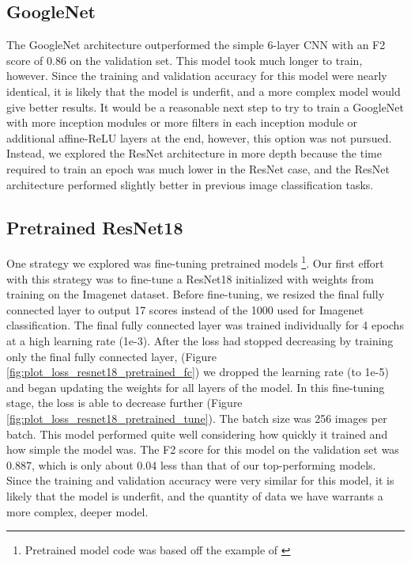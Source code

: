 \documentclass[10pt,twocolumn,letterpaper]{article}
\begin{document}
\subsection*{GoogleNet}

The GoogleNet architecture outperformed the simple 6-layer CNN with an F2 score of 0.86 on the validation set. This model took much longer to train, however. Since the training and validation accuracy for this model were nearly identical, it is likely that the model is underfit, and a more complex model would give better results. It would be a reasonable next step to try to train a GoogleNet with more inception modules or more filters in each inception module or additional affine-ReLU layers at the end, however, this option was not pursued. Instead, we explored the ResNet architecture in more depth because the time required to train an epoch was much lower in the ResNet case, and the ResNet architecture performed slightly better in previous image classification tasks. \cite{TransferLearning1} \cite{imagenet}

\subsection*{Pretrained ResNet18}

One strategy we explored was fine-tuning pretrained models \footnote{Pretrained model code was based off the example of \cite{Johnson2017}}. Our first effort with this strategy was to fine-tune a ResNet18 initialized with weights from training on the Imagenet dataset. Before fine-tuning, we resized the final fully connected layer to output 17 scores instead of the 1000 used for Imagenet classification. The final fully connected layer was trained individually for 4 epochs at a high learning rate (1e-3). After the loss had stopped decreasing by training only the final fully connected layer, (Figure \ref{fig:plot_loss_resnet18_pretrained_fc}) we dropped the learning rate (to 1e-5) and began updating the weights for all layers of the model. In this fine-tuning stage, the loss is able to decrease further (Figure \ref{fig:plot_loss_resnet18_pretrained_tune}). The batch size was 256 images per batch. This model performed quite well considering how quickly it trained and how simple the model was. The F2 score for this model on the validation set was 0.887, which is only about 0.04 less than that of our top-performing models. Since the training and validation accuracy were very similar for this model, it is likely that the model is underfit, and the quantity of data we have warrants a more complex, deeper model.
\end{document}
